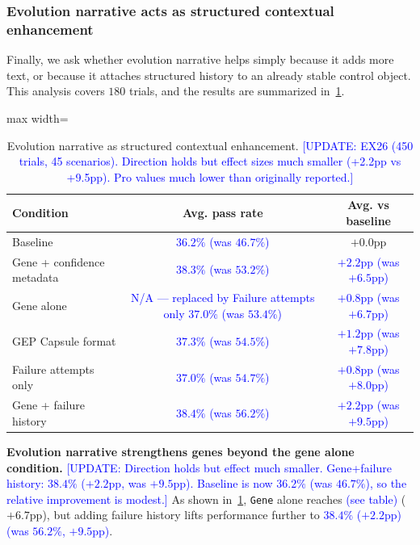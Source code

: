 \documentclass{article}
\newcommand{\blue}[1]{\textcolor{blue}{#1}}
\newcommand{\nbf}[1]{{\noindent \textbf{#1}}}
\begin{document}
\subsubsection{Evolution narrative acts as structured contextual enhancement}

Finally, we ask whether evolution narrative helps simply because it adds more text, or because it attaches structured history to an already stable control object. This analysis covers $180$ trials, and the results are summarized in~\cref{tab:evolution_narrative}.


\begin{table}[h]
\centering
\caption{Evolution narrative as structured contextual enhancement. \blue{[UPDATE: EX26 (450 trials, 45 scenarios). Direction holds but effect sizes much smaller (+2.2pp vs +9.5pp). Pro values much lower than originally reported.]}}
\label{tab:evolution_narrative}
\begin{adjustbox}{max width=\textwidth}
\begin{tabular}{lcc}
\toprule
\textbf{Condition} & \textbf{Avg. pass rate} & \textbf{Avg. vs baseline} \\
\midrule
Baseline & \blue{$36.2\%$ (was $46.7\%$)} & $+0.0$pp \\
Gene + confidence metadata & \blue{$38.3\%$ (was $53.2\%$)} & \blue{$+2.2$pp (was $+6.5$pp)} \\
Gene alone & \blue{N/A --- replaced by Failure attempts only $37.0\%$ (was $53.4\%$)} & \blue{$+0.8$pp (was $+6.7$pp)} \\
GEP Capsule format & \blue{$37.3\%$ (was $54.5\%$)} & \blue{$+1.2$pp (was $+7.8$pp)} \\
Failure attempts only & \blue{$37.0\%$ (was $54.7\%$)} & \blue{$+0.8$pp (was $+8.0$pp)} \\
\cellcolor{bestRow}Gene + failure history & \cellcolor{bestRow}\blue{$38.4\%$ (was $56.2\%$)} & \cellcolor{bestRow}\blue{$+2.2$pp (was $+9.5$pp)} \\
\bottomrule
\end{tabular}
\end{adjustbox}
\end{table}


\nbf{Evolution narrative strengthens genes beyond the gene alone condition.}
\blue{[UPDATE: Direction holds but effect much smaller. Gene+failure history: $38.4\%$ ($+2.2$pp, was $+9.5$pp). Baseline is now $36.2\%$ (was $46.7\%$), so the relative improvement is modest.]}
As shown in~\cref{tab:evolution_narrative}, \texttt{Gene} alone reaches \blue{(see table)} ($+6.7$pp), but adding failure history lifts performance further to \blue{$38.4\%$ ($+2.2$pp) (was $56.2\%$, $+9.5$pp)}.
\end{document}
